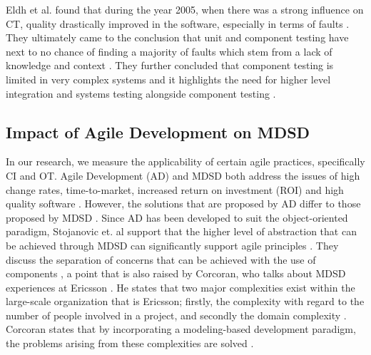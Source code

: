 \documentclass[fina_report_innit.tex]{subfiles}
\begin{document}
Eldh et al. found that during the year 2005, when there was a strong influence on CT, quality drastically improved in the software, especially in terms of faults \cite{eldh2007component}. They ultimately came to the conclusion that unit and component testing have next to no chance of finding a majority of faults which stem from a lack of knowledge and context \cite{eldh2007component}. They further concluded that component testing is limited in very complex systems and it highlights the need for higher level integration and systems testing alongside component testing \cite{eldh2007component}.


\subsection{Impact of Agile Development on MDSD}

In our research, we measure the applicability of certain agile practices, specifically CI and OT. Agile Development (AD) and MDSD both address the issues of high change rates, time-to-market, increased return on investment (ROI) and high quality software \cite{stojanovic2003component}. However, the solutions that are proposed by AD differ to those proposed by MDSD \cite{stojanovic2003component}. Since AD has been developed to suit the object-oriented paradigm, Stojanovic et. al support that the higher level of abstraction that can be achieved through MDSD can significantly support agile principles \cite{stojanovic2003component}. They discuss the separation of concerns that can be achieved with the use of components \cite{stojanovic2003component}, a point that is also raised by Corcoran, who talks about MDSD experiences at Ericsson \cite{selic2010modelling}. He states that two major complexities exist within the large-scale organization that is Ericsson; firstly, the complexity with regard to the number of people involved in a project, and secondly the domain complexity \cite{selic2010modelling}. Corcoran states that by incorporating a modeling-based development paradigm, the problems arising from these complexities are solved \cite{selic2010modelling}. 
\\
\end{document}
